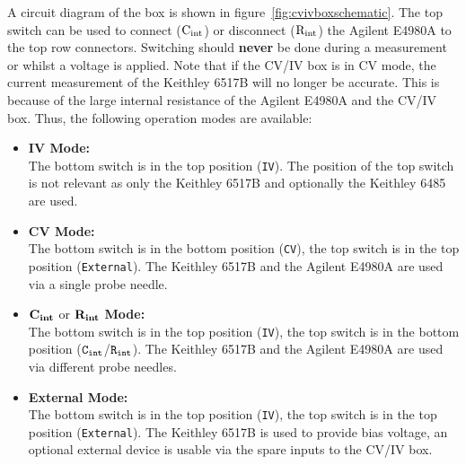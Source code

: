 \documentclass[a4paper]{article}
\begin{document}
A circuit diagram of the box is shown in figure~\ref{fig:cvivboxschematic}.
The top switch can be used to connect (${\rm C_{int}}$) or disconnect (${\rm R_{int}}$) the Agilent E4980A to the top row connectors.
Switching should {\bf never} be done during a measurement or whilst a voltage is applied.
Note that if the CV/IV box is in CV mode, the current measurement of the Keithley 6517B will no longer be accurate.
This is because of the large internal resistance of the Agilent E4980A and the CV/IV box.
Thus, the following operation modes are available:\\

\begin{itemize}
\item{{\bf IV Mode:\\}}
The bottom switch is in the top position ({\tt IV}).
The position of the top switch is not relevant as only the Keithley 6517B and optionally the Keithley 6485 are used.

\item{{\bf CV Mode:\\}}
The bottom switch is in the bottom position ({\tt CV}), the top switch is in the top position ({\tt External}).
The Keithley 6517B and the Agilent E4980A are used via a single probe needle.

\item{${\rm {\bf C_{int}}}$ or ${\rm {\bf R_{int}}}$ {\bf Mode:\\}}
The bottom switch is in the top position ({\tt IV}), the top switch is in the bottom position (${\tt C_{int}}$/${\tt R_{int}}$).
The Keithley 6517B and the Agilent E4980A are used via different probe needles.

\item{{\bf External Mode:\\}}
The bottom switch is in the top position ({\tt IV}), the top switch is in the top position ({\tt External}).
The Keithley 6517B is used to provide bias voltage, an optional external device is usable via the spare inputs to the CV/IV box.
\end{itemize}
\end{document}
